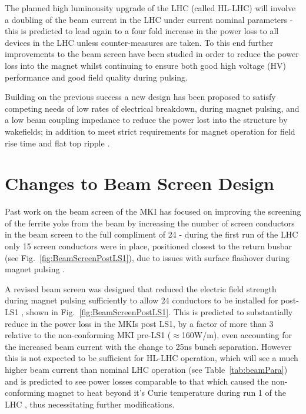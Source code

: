 \documentclass[a4paper,
              ]{jacow}
\begin{document}
The planned high luminousity upgrade of the LHC (called HL-LHC) will involve a doubling of the beam current in the LHC under current nominal parameters \cite{HLLHCPara} - this is predicted to lead again to a four fold increase in the power loss to all devices in the LHC unless counter-measures are taken. To this end further improvements to the beam screen have been studied in order to reduce the power loss into the magnet whilst continuing to ensure both good high voltage (HV) performance and good field quality during pulsing.

Building on the previous success a new design has been proposed to satisfy competing needs of low rates of electrical breakdown, during magnet pulsing, and a low beam coupling impedance to reduce the power lost into the structure by wakefields; in addition to meet strict requirements for magnet operation for field rise time and flat top ripple \cite{mkiUpgrade}. 


\section{Changes to Beam Screen Design}

Past work on the beam screen of the MKI has focused on improving the screening of the ferrite yoke from the beam by increasing the number of screen conductors in the beam screen to the full compliment of 24 - during the first run of the LHC only 15 screen conductors were in place, positioned closest to the return busbar (see Fig.~\ref{fig:BeamScreenPostLS1}), due to issues with surface flashover during magnet pulsing \cite{mki-ElecBreakdown}. 

A revised beam screen was designed that reduced the electric field strength during magnet pulsing sufficiently to allow 24 conductors to be installed for post-LS1 \cite{mkiUpgrade}, shown in Fig.~\ref{fig:BeamScreenPostLS1}. This is predicted to substantially reduce in the power loss in the MKIs post LS1, by a factor of more than 3 relative to the non-conforming MKI pre-LS1 ($\approx$160W/m), even accounting for the increased beam current with the change to 25ns bunch separation. However this is not expected to be sufficient for HL-LHC operation, which will see a much higher beam current than nominal LHC operation (see Table~\ref{tab:beamPara}) and is predicted to see power losses comparable to that which caused the non-conforming magnet to heat beyond it's Curie temperature during run 1 of the LHC \cite{mkiImp2014}, thus necessitating further modifications.
\end{document}
